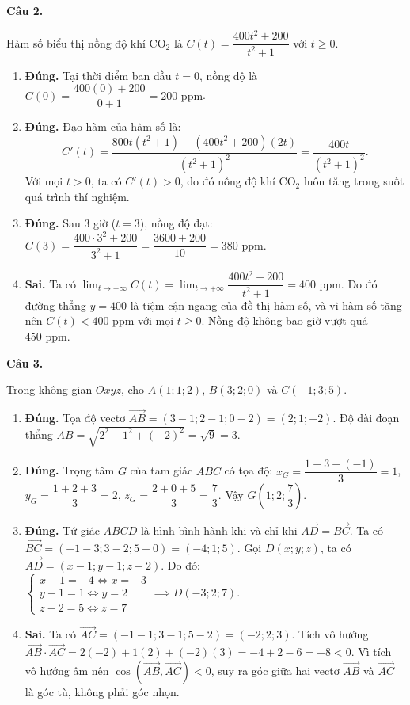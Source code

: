 \documentclass[12pt,a4paper]{article}
\newcommand{\loigiai}[1]{\par\medskip\Needspace{4\baselineskip}\noindent\textbf{#1}\par\nobreak}
\begin{document}
\loigiai{Câu 2.}
Hàm số biểu thị nồng độ khí $\text{CO}_2$ là $C(t)=\dfrac{400t^2+200}{t^2+1}$ với $t\ge 0$.
\begin{enumerate}
\item \textbf{Đúng.} Tại thời điểm ban đầu $t=0$, nồng độ là $C(0) = \dfrac{400(0)+200}{0+1} = 200\text{ ppm}$.
\item \textbf{Đúng.} Đạo hàm của hàm số là:
\[
C'(t) = \dfrac{800t(t^2+1) - (400t^2+200)(2t)}{(t^2+1)^2} = \dfrac{400t}{(t^2+1)^2}.
\]
Với mọi $t>0$, ta có $C'(t)>0$, do đó nồng độ khí $\text{CO}_2$ luôn tăng trong suốt quá trình thí nghiệm.
\item \textbf{Đúng.} Sau 3 giờ ($t=3$), nồng độ đạt:
$C(3) = \dfrac{400\cdot 3^2 + 200}{3^2+1} = \dfrac{3600+200}{10} = 380\text{ ppm}$.
\item \textbf{Sai.} Ta có $\lim_{t\to+\infty} C(t) = \lim_{t\to+\infty} \dfrac{400t^2+200}{t^2+1} = 400\text{ ppm}$.
Do đó đường thẳng $y=400$ là tiệm cận ngang của đồ thị hàm số, và vì hàm số tăng nên $C(t)<400\text{ ppm}$ với mọi $t\ge 0$. Nồng độ không bao giờ vượt quá $450\text{ ppm}$.
\end{enumerate}

\loigiai{Câu 3.}
Trong không gian $Oxyz$, cho $A(1;1;2)$, $B(3;2;0)$ và $C(-1;3;5)$.
\begin{enumerate}
\item \textbf{Đúng.} Tọa độ vectơ $\vec{AB} = (3-1; 2-1; 0-2) = (2;1;-2)$.
Độ dài đoạn thẳng $AB = \sqrt{2^2+1^2+(-2)^2} = \sqrt{9} = 3$.
\item \textbf{Đúng.} Trọng tâm $G$ của tam giác $ABC$ có tọa độ:
$x_G = \dfrac{1+3+(-1)}{3} = 1$, $y_G = \dfrac{1+2+3}{3} = 2$, $z_G = \dfrac{2+0+5}{3} = \dfrac{7}{3}$.
Vậy $G\left(1;2;\dfrac{7}{3}\right)$.
\item \textbf{Đúng.} Tứ giác $ABCD$ là hình bình hành khi và chỉ khi $\vec{AD}=\vec{BC}$.
Ta có $\vec{BC} = (-1-3; 3-2; 5-0) = (-4;1;5)$.
Gọi $D(x;y;z)$, ta có $\vec{AD} = (x-1; y-1; z-2)$.
Do đó: $\begin{cases} x-1 = -4 \iff x = -3\\ y-1 = 1 \iff y = 2\\ z-2 = 5 \iff z = 7 \end{cases} \implies D(-3;2;7)$.
\item \textbf{Sai.} Ta có $\vec{AC} = (-1-1; 3-1; 5-2) = (-2;2;3)$.
Tích vô hướng $\vec{AB}\cdot\vec{AC} = 2(-2) + 1(2) + (-2)(3) = -4 + 2 - 6 = -8 < 0$.
Vì tích vô hướng âm nên $\cos(\vec{AB},\vec{AC}) < 0$, suy ra góc giữa hai vectơ $\vec{AB}$ và $\vec{AC}$ là góc tù, không phải góc nhọn.
\end{enumerate}
\end{document}
